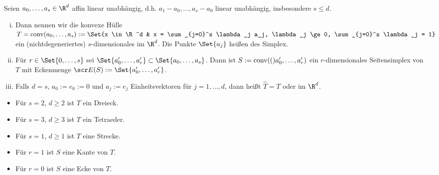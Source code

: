 \begin{df}[Simplex] \label{3.57}
	Seien $a_0, \dotsc, a_s \in \R^d$ affin linear unabhängig, d.h. $a_1 - a_0, \dotsc, a_s - a_0$ linear unabhängig, insbesondere $s \le d$.
	\begin{enumerate}[i)]
		\item
			Dann nennen wir die konvexe Hülle
			\begin{math}
				T =
				\ConvexHull{a_0, \dotsc, a_s}
				:= \Set{x \in \R^d & x = \sum_{j=0}^s \lambda_j a_j, \lambda_j \ge 0, \sum_{j=0}^s \lambda_j = 1}
			\end{math}
			ein (nichtdegeneriertes) $s$-dimensionales  im $\R^d$.
			Die Punkte $\Set{a_j}$ heißen  des Simplex.
		\item
			Für $r \in \Set{0, \dotsc, s}$ sei $\Set{a_0', \dotsc, a_r'} \subset \Set{a_0, \dotsc, a_s}$.
			Dann ist $S := \operatorname{conv}(()a_0', \dotsc, a_r')$ ein $r$-dimensionales Seitensimplex von $T$ mit Eckenmenge $\scr E(S) := \Set{a_0', \dotsc, a_r'}$.
		\item
			Falls $d = s$, $a_0 := e_0 := 0$ und $a_j := e_j$ Einheitsvektoren für $j = 1, \dotsc, d$, dann heißt $\hat T = T$  oder  im $\R^d$.
	\end{enumerate}
\end{df}

\begin{ex*}
	\begin{itemize}
		\item
			Für $s = 2$, $d \ge 2$ ist $T$ ein Dreieck.
		\item
			Für $s = 3$, $d \ge 3$ ist $T$ ein Tetraeder.
		\item
			Für $s = 1$, $d \ge 1$ ist $T$ eine Strecke.
		\item
			Für $r = 1$ ist $S$ eine Kante von $T$.
		\item
			Für $r = 0$ ist $S$ eine Ecke von $T$.
	\end{itemize}
\end{ex*}

